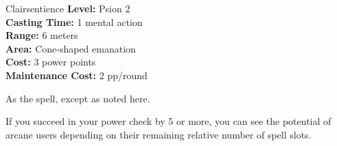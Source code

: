 {Clairsentience}
{
	\textbf{Level:}
	Psion 2\\
	\textbf{Casting Time:}
	1 mental action\\
	\textbf{Range:}
	6 meters\\
	\textbf{Area:}
	Cone-shaped emanation\\
	\textbf{Cost:}
	3 power points\\
	\textbf{Maintenance Cost:}
	2 pp/round\\
}
{
	As the  spell, except as noted here.

	If you succeed in your power check by 5 or more, you can see the potential of arcane users depending on their remaining relative number of spell slots.

}